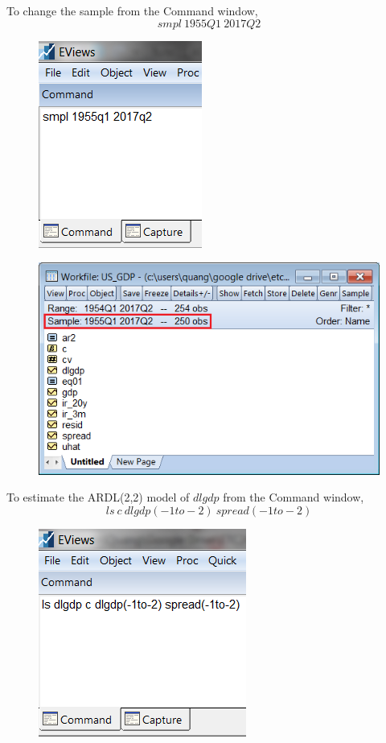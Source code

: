\documentclass[12pt]{report}
\begin{document}
\noindent To change the sample from the Command window, $$smpl\ 1955Q1\ 2017Q2$$
\begin{figure}[H]
	\centerline{\includegraphics{tute11_41}}
\end{figure}
\vspace{-\baselineskip}
\begin{figure}[H]
	\centerline{\includegraphics{tute11_43}}
\end{figure}
\vspace{-\baselineskip} \noindent To estimate the ARDL(2,2) model of $dlgdp$ from the Command window, $$ls\ c\ dlgdp(-1to-2)\ spread(-1to-2)$$
\begin{figure}[H]
	\centerline{\includegraphics{tute11_42}}
\end{figure}
\end{document}
